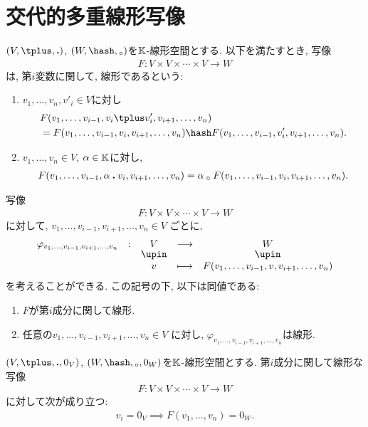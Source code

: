 \section{交代的多重線形写像}
\begin{definition}
  $(V,\plus,\act)$, $(W,\pplus,\aact)$を$\mathbb{K}$-線形空間とする.
  以下を満たすとき,
  写像
  \begin{align*}
    F\colon V\times V\times \cdots \times V\to W
  \end{align*}
  は,
  第$i$変数に関して, 
  線形であるという:
  \begin{enumerate}
  \item $v_1,\ldots,v_n,v'_i\in V$に対し
    \begin{align*}
      &F(v_1,\ldots,v_{i-1},v_i\plus v'_i,v_{i+1},\ldots,v_n)\\&=F(v_1,\ldots,v_{i-1},v_i,v_{i+1},\ldots,v_n)\pplus F(v_1,\ldots,v_{i-1},v'_i,v_{i+1},\ldots,v_n).
    \end{align*}
  \item $v_1,\ldots,v_n\in V$, $\alpha\in\mathbb{K}$に対し,
    \begin{align*}
      F(v_1,\ldots,v_{i-1},\alpha\mathbin{\boldsymbol{.}} v_i,v_{i+1},\ldots,v_n)=\alpha\mathbin{{}_\circ} F(v_1,\ldots,v_{i-1},v_i,v_{i+1},\ldots,v_n).
    \end{align*}
  \end{enumerate}
\end{definition}
\begin{remark}
  写像
  \begin{align*}
    F\colon V\times V\times \cdots \times V\to W
  \end{align*}
  に対して,
  $v_1,\ldots,v_{i-1},v_{i+1},\ldots,v_n\in V$
  ごとに,
  \begin{align*}
    \shazo{\varphi_{v_1,\ldots,v_{i-1},v_{i+1},\ldots,v_n}}{V}{W}
    {v}{F(v_1,\ldots,v_{i-1},v,v_{i+1},\ldots,v_n)}
  \end{align*}
  を考えることができる.
  この記号の下, 以下は同値である:
  \begin{enumerate}
  \item $F$が第$i$成分に関して線形.
  \item 任意の$v_1,\ldots,v_{i-1},v_{i+1},\ldots,v_n\in V$
    に対し, $\varphi_{v_1,\ldots,v_{i-1},v_{i+1},\ldots,v_n}$は線形.
  \end{enumerate}
\end{remark}
\begin{cor}
  $(V,\plus,\act,0_V)$, $(W,\pplus,\aact,0_W)$を$\mathbb{K}$-線形空間とする.
  第$i$成分に関して線形な写像
  \begin{align*}
    F\colon V\times V\times \cdots \times V\to W
  \end{align*}
  に対して次が成り立つ:
  \begin{align*}
  v_i=0_V\implies F(v_1,\ldots,v_n)=0_W.
  \end{align*}
\end{cor}
